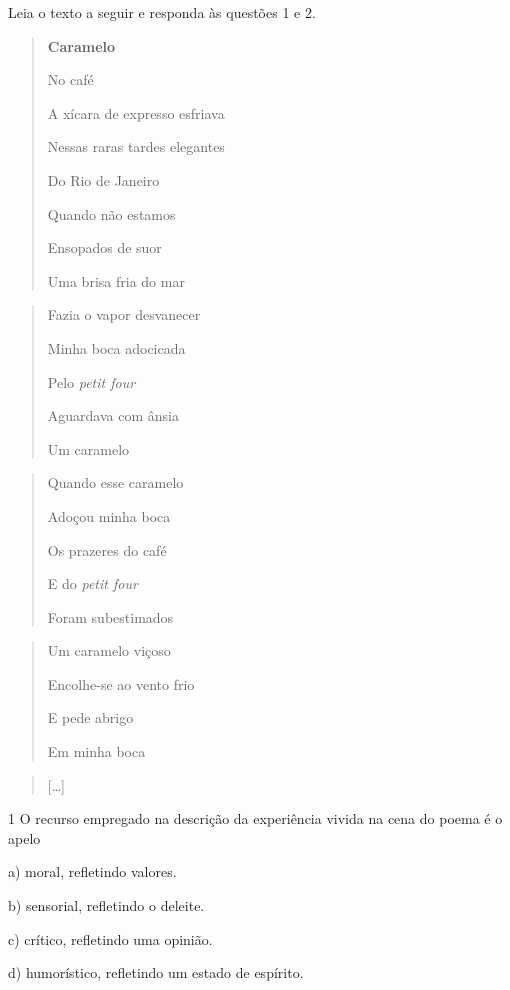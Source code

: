 Leia o texto a seguir e responda às questões 1 e 2.

\begin{quote}
\textbf{Caramelo}

No café

A xícara de expresso esfriava

Nessas raras tardes elegantes

Do Rio de Janeiro

Quando não estamos

Ensopados de suor

Uma brisa fria do mar
\end{quote}

\begin{quote}
Fazia o vapor desvanecer

Minha boca adocicada

Pelo \emph{petit four}

Aguardava com ânsia

Um caramelo
\end{quote}

\begin{quote}
Quando esse caramelo

Adoçou minha boca

Os prazeres do café

E do \emph{petit four}

Foram subestimados
\end{quote}

\begin{quote}
Um caramelo viçoso

Encolhe-se ao vento frio

E pede abrigo

Em minha boca
\end{quote}

\begin{quote}
{[}\ldots{]}
\end{quote}


\num{1} O recurso empregado na descrição da experiência vivida na cena
do poema é o apelo

a) moral, refletindo valores.

b) sensorial, refletindo o deleite.

c) crítico, refletindo uma opinião.

d) humorístico, refletindo um estado de espírito.

